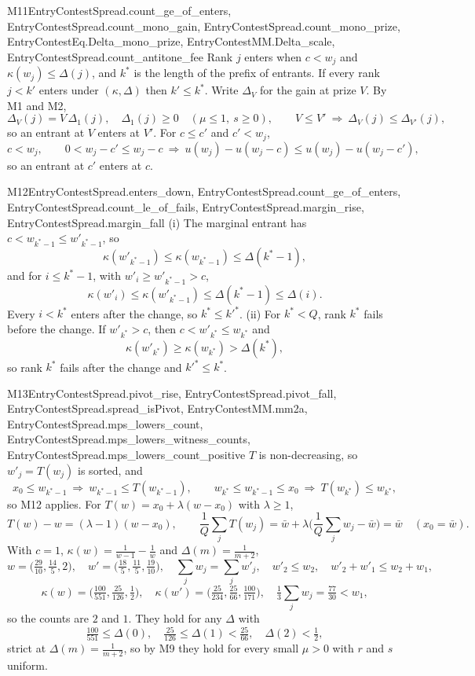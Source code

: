 \begin{mproof}{M11}{EntryContestSpread.count_ge_of_enters, EntryContestSpread.count_mono_gain, EntryContestSpread.count_mono_prize, EntryContestEq.Delta_mono_prize, EntryContestMM.Delta_scale, EntryContestSpread.count_antitone_fee}
Rank $j$ enters when $c<w_j$ and $\kappa(w_j)\le\Delta(j)$, and $k^*$ is the length of
the prefix of entrants. If every rank $j<k'$ enters under $(\kappa,\Delta)$ then
$k'\le k^*$. Write $\Delta_V$ for the gain at prize $V$. By M1 and M2,
\[
  \Delta_V(j)=V\,\Delta_1(j),\quad \Delta_1(j)\ge0\quad(\mu\le1,\ s\ge0),\qquad
  V\le V'\ \Rightarrow\ \Delta_V(j)\le\Delta_{V'}(j),
\]
so an entrant at $V$ enters at $V'$. For $c\le c'$ and $c'<w_j$,
\[
  c<w_j,\qquad 0<w_j-c'\le w_j-c\ \Rightarrow\ u(w_j)-u(w_j-c)\le u(w_j)-u(w_j-c'),
\]
so an entrant at $c'$ enters at $c$.
\end{mproof}

\begin{mproof}{M12}{EntryContestSpread.enters_down, EntryContestSpread.count_ge_of_enters, EntryContestSpread.count_le_of_fails, EntryContestSpread.margin_rise, EntryContestSpread.margin_fall}
(i) The marginal entrant has $c<w_{k^*-1}\le w'_{k^*-1}$, so
\[
  \kappa(w'_{k^*-1})\le\kappa(w_{k^*-1})\le\Delta(k^*-1),
\]
and for $i\le k^*-1$, with $w'_i\ge w'_{k^*-1}>c$,
\[
  \kappa(w'_i)\le\kappa(w'_{k^*-1})\le\Delta(k^*-1)\le\Delta(i).
\]
Every $i<k^*$ enters after the change, so $k^*\le k'^*$.
(ii) For $k^*<Q$, rank $k^*$ fails before the change. If $w'_{k^*}>c$, then
$c<w'_{k^*}\le w_{k^*}$ and
\[
  \kappa(w'_{k^*})\ge\kappa(w_{k^*})>\Delta(k^*),
\]
so rank $k^*$ fails after the change and $k'^*\le k^*$.
\end{mproof}

\begin{mproof}{M13}{EntryContestSpread.pivot_rise, EntryContestSpread.pivot_fall, EntryContestSpread.spread_isPivot, EntryContestMM.mm2a, EntryContestSpread.mps_lowers_count, EntryContestSpread.mps_lowers_witness_counts, EntryContestSpread.mps_lowers_count_positive}
$T$ is non-decreasing, so $w'_j=T(w_j)$ is sorted, and
\[
  x_0\le w_{k^*-1}\ \Rightarrow\ w_{k^*-1}\le T(w_{k^*-1}),\qquad
  w_{k^*}\le w_{k^*-1}\le x_0\ \Rightarrow\ T(w_{k^*})\le w_{k^*},
\]
so M12 applies. For $T(w)=x_0+\lambda(w-x_0)$ with $\lambda\ge1$,
\[
  T(w)-w=(\lambda-1)(w-x_0),\qquad
  \frac1Q\sum_jT(w_j)=\bar w+\lambda\Big(\frac1Q\sum_jw_j-\bar w\Big)=\bar w
  \quad (x_0=\bar w).
\]
With $c=1$, $\kappa(w)=\frac1{w-1}-\frac1w$ and $\Delta(m)=\frac1{m+2}$,
\[
  w=\big(\tfrac{29}{10},\tfrac{14}5,2\big),\quad
  w'=\big(\tfrac{18}5,\tfrac{11}5,\tfrac{19}{10}\big),\quad
  \textstyle\sum_jw_j=\sum_jw'_j,\quad w'_2\le w_2,\quad w'_2+w'_1\le w_2+w_1,
\]
\[
  \kappa(w)=\big(\tfrac{100}{551},\tfrac{25}{126},\tfrac12\big),\quad
  \kappa(w')=\big(\tfrac{25}{234},\tfrac{25}{66},\tfrac{100}{171}\big),\quad
  \tfrac13\textstyle\sum_jw_j=\tfrac{77}{30}<w_1,
\]
so the counts are $2$ and $1$. They hold for any $\Delta$ with
\[
  \tfrac{100}{551}\le\Delta(0),\quad \tfrac{25}{126}\le\Delta(1)<\tfrac{25}{66},\quad
  \Delta(2)<\tfrac12,
\]
strict at $\Delta(m)=\frac1{m+2}$, so by M9 they hold for every small $\mu>0$ with
$r$ and $s$ uniform.
\end{mproof}

